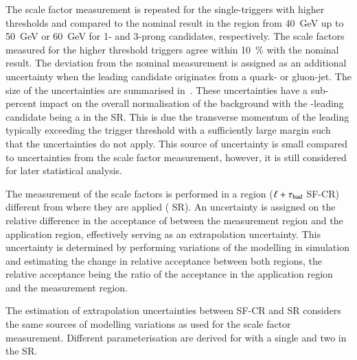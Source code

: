 The scale factor measurement is repeated for the single-\tauhadvis triggers with
higher thresholds and compared to the nominal result in the \faketauhadvis \pT
region from \SI{40}{\GeV} up to \SI{50}{\GeV} or \SI{60}{\GeV} for 1- and
3-prong candidates, respectively. The scale factors measured for the higher
threshold triggers agree within \SI{10}{\percent} with the nominal result. The
deviation from the nominal measurement is assigned as an additional uncertainty
when the leading \tauhadvis candidate originates from a quark- or gluon-jet. The
size of the uncertainties are summarised
in~. These uncertainties have a
sub-percent impact on the overall normalisation of the \ttbarFakes background
with the \pT-leading \tauhadvis candidate being a \faketauhadvis in the \hadhad
SR. This is due the transverse momentum of the leading \tauhadvis typically
exceeding the trigger threshold with a sufficiently large margin such that the
uncertainties do not apply. This source of uncertainty is small compared to
uncertainties from the scale factor measurement, however, it is still considered
for later statistical analysis.

\begin{table}[htbp]
  \centering

  \caption{Size of the uncertainty comparing scale factors measured
    for triggers with $\pTHLT > \SI{25}{\GeV}$ and
    $\pTHLT > \SI{35}{\GeV}$ thresholds. The uncertainty is given
    relative to all events from \ttbar in the \hadhad channel signal
    region where the leading \tauhadvis is a \faketauhadvis with \pT
    close to the \SI{40}{\GeV} threshold.}%
  \label{tab:ttbarSF_tau25_35_uncertainty}

  
\end{table}

The measurement of the scale factors is performed in a region
($\ell+\tau_{\text{had}}$ SF-CR) different from where they are applied (\hadhad
SR). An uncertainty is assigned on the relative difference in the
acceptance of \ttbarFakes between the measurement region and the
application region, effectively serving as an extrapolation
uncertainty. This uncertainty is determined by performing variations
of the \ttbar modelling in simulation and estimating the change in
relative acceptance between both regions, the relative acceptance
being the ratio of the acceptance in the application region and the
measurement region.

The estimation of extrapolation uncertainties between SF-CR and
\hadhad SR considers the same sources of \ttbar modelling variations
as used for the scale factor measurement. Different parameterisation
are derived for \ttbar with a single \faketauhadvis and two
\faketauhadvis in the \hadhad SR.

